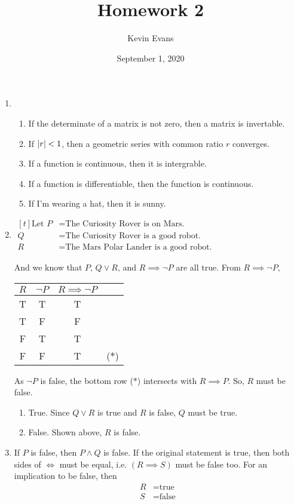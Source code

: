 \documentclass{homework}
\title{Homework 2}
\author{Kevin Evans}
\date{September 1, 2020}
\begin{document}
	\maketitle
	\begin{enumerate}
		\item \begin{enumerate}
			\item If the determinate of a matrix is not zero, then a matrix is invertable.
			\item If $\abs{r} < 1$, then a geometric series with common ratio $r$ converges.
			\item If a function is continuous, then it is intergrable.
			\item If a function is differentiable, then the function is continuous.
			\item If I'm wearing a hat, then it is sunny.
		\end{enumerate}
	
		\item $\begin{aligned}[t]
			\text{Let } P & = \text{The Curiosity Rover is on Mars.} \\
			Q & = \text{The Curiosity Rover is a good robot.} \\
			R & = \text{The Mars Polar Lander is a good robot.}
		\end{aligned}$
		
		And we know that $P$, $Q \vee R$, and $R \implies \neg P$ are all true. From $R \implies \neg P$,
		\begin{center}
			\begin{tabular}{cc|cl}
				$R$ & $\neg P$ & $R \implies \neg P$ & \\
				\midrule
				T & T & T & \\
				T & F & F & \\
				F & T & T & \\
				F & F & T & ($*$)
			\end{tabular}
		\end{center}
		As $\neg P$ is false, the bottom row ($*$) intersects with $R \implies P$. So, $R$ must be false.
		
		\begin{enumerate}
			\item True. Since $Q \vee R$ is true and $R$ is false, $Q$ must be true.
			\item False. Shown above, $R$ is false.
		\end{enumerate}
	
		\item If $P$ is false, then $P \wedge Q$ is false. If the original statement is true, then both sides of $\iff$ must be equal, i.e. $(R \implies S)$ must be false too. For an implication to be false, then \begin{align*}
			R & = \text{true} \\
			S & = \text{false}
		\end{align*}
	

\end{enumerate}
\end{document}
